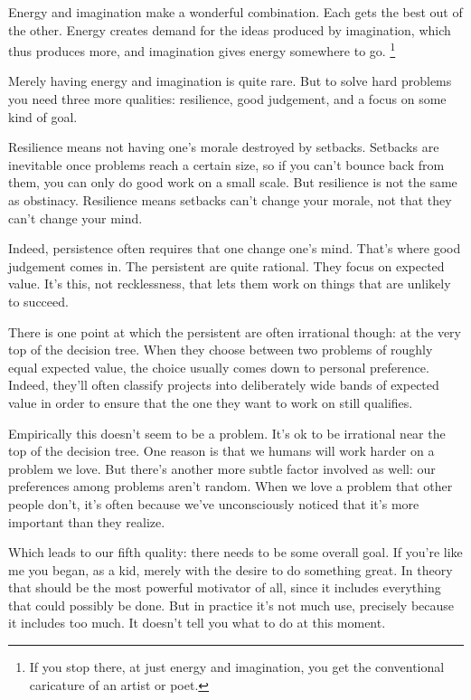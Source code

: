 Energy and imagination make a wonderful combination. Each gets the best
out of the other. Energy creates demand for the ideas produced by
imagination, which thus produces more, and imagination gives energy
somewhere to go. \footnote{If you stop there, at just energy and imagination, you get the
conventional caricature of an artist or poet.}

Merely having energy and imagination is quite rare. But to solve hard
problems you need three more qualities: resilience, good judgement, and
a focus on some kind of goal.

Resilience means not having one's morale destroyed by setbacks. Setbacks
are inevitable once problems reach a certain size, so if you can't
bounce back from them, you can only do good work on a small scale. But
resilience is not the same as obstinacy. Resilience means setbacks can't
change your morale, not that they can't change your mind.

Indeed, persistence often requires that one change one's mind. That's
where good judgement comes in. The persistent are quite rational. They
focus on expected value. It's this, not recklessness, that lets them
work on things that are unlikely to succeed.

There is one point at which the persistent are often irrational though:
at the very top of the decision tree. When they choose between two
problems of roughly equal expected value, the choice usually comes down
to personal preference. Indeed, they'll often classify projects into
deliberately wide bands of expected value in order to ensure that the
one they want to work on still qualifies.

Empirically this doesn't seem to be a problem. It's ok to be irrational
near the top of the decision tree. One reason is that we humans will
work harder on a problem we love. But there's another more subtle factor
involved as well: our preferences among problems aren't random. When we
love a problem that other people don't, it's often because we've
unconsciously noticed that it's more important than they realize.

Which leads to our fifth quality: there needs to be some overall goal.
If you're like me you began, as a kid, merely with the desire to do
something great. In theory that should be the most powerful motivator of
all, since it includes everything that could possibly be done. But in
practice it's not much use, precisely because it includes too much. It
doesn't tell you what to do at this moment.

